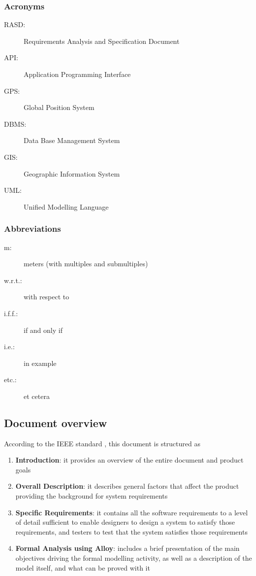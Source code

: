 \subsubsection{Acronyms}
	\begin{description}
		\item [RASD:] Requirements Analysis and Specification Document
		\item [API:] Application Programming Interface
		\item [GPS:] Global Position System
		\item [DBMS:] Data Base Management System
		\item [GIS:] Geographic Information System
		\item [UML:] Unified Modelling Language
			
	\end{description}
\subsubsection{Abbreviations}
	\begin{description}
		\item [m:] meters (with multiples and submultiples)
		\item [w.r.t.:] with respect to
		\item [i.f.f.:] if and only if
		\item [i.e.:] in example
		\item [etc.:] et cetera
	\end{description}

\subsection{Document overview}
According to the IEEE standard \cite{IeeeRasd}, this document is structured as
\begin{enumerate}
	\item \textbf{Introduction}: it provides an overview of the entire document and product goals
	\item \textbf{Overall Description}: it describes general factors that affect the product providing the background for system requirements
	\item \textbf{Specific Requirements}: it contains all the software requirements to a level of detail sufficient to enable designers to design a system to satisfy those requirements, and testers to test that the system satisfies those requirements
	\item \textbf{Formal Analysis using Alloy}: includes a brief presentation of the main objectives driving the formal modelling activity, as well as a description of the model itself, and what can be proved with it
\end{enumerate}